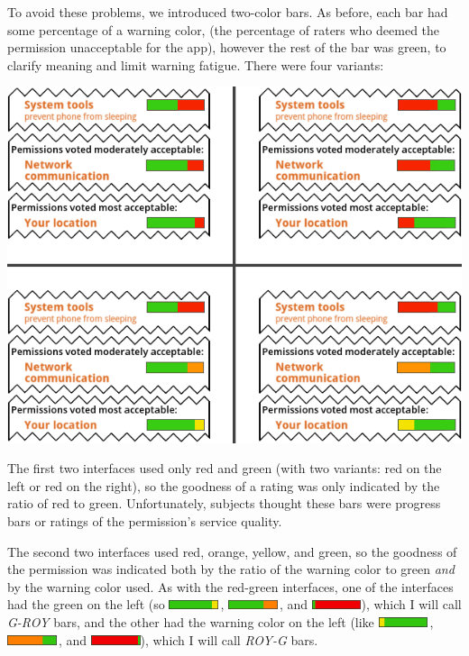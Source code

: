 \documentclass[11pt]{article}
\begin{document}
To avoid these problems, we
introduced two-color bars. As before, each bar had some percentage of 
a warning color, (the percentage of raters who deemed the permission
unacceptable for the app), however the rest of the
bar was green, to clarify meaning and limit warning fatigue.
There were four variants:
\label{ss-sec-pbars-r4}
\begin{center}
\includegraphics[width=.85\linewidth]{candidate-img/bars/barsR4.png}
\end{center}
The first two interfaces used only red 
and green (with two variants: red on the left or red on the right),
so the goodness of a rating was only indicated by the ratio of red to green.
Unfortunately, subjects thought these bars were
progress bars or ratings of the 
permission's service quality.

The second two interfaces used red, orange, yellow, and green, so the goodness of the permission
was indicated both by the ratio of the warning color to green \emph{and} by the warning color
used. As with the red-green interfaces, one of the interfaces had the green on the left (so 
\includegraphics[height=8pt]{img/Bars4/RedYellowGreen/GreenYellowBar.png}\,,
\includegraphics[height=8pt]{img/Bars4/RedYellowGreen/GreenOrangeBar.png}\,, and 
\includegraphics[height=8pt]{img/Bars4/RedYellowGreen/GreenRedBar.png}),
which I will call \emph{G-ROY} bars, and the
other had the warning color on the left (like 
\includegraphics[height=8pt]{img/Bars4/RedYellowGreen/YellowGreenBar.png}\,,
\includegraphics[height=8pt]{img/Bars4/RedYellowGreen/OrangeGreenBar.png}\,, and
\includegraphics[height=8pt]{img/Bars4/RedYellowGreen/RedGreenBar.png}),
which I will call \emph{ROY-G} bars.
\end{document}
